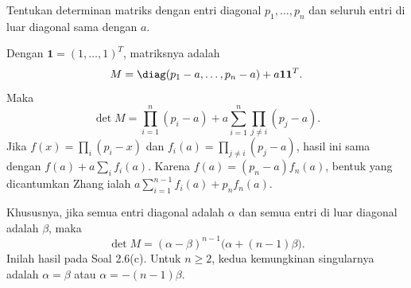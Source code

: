 \begin{exam}
      Tentukan determinan matriks dengan entri diagonal $p_1,\ldots,p_n$
      dan seluruh entri di luar diagonal sama dengan $a$.
\end{exam}
\begin{solution}
      Dengan $\boldsymbol{1}=(1,\ldots,1)^T$, matriksnya adalah
      \[
            M=\diag(p_1-a,\ldots,p_n-a)+a\boldsymbol{1}\boldsymbol{1}^T.
      \]
      Maka
      \[
            \det M=\prod_{i=1}^n(p_i-a)
            +a\sum_{i=1}^n\prod_{j\ne i}(p_j-a).
      \]
      Jika $f(x)=\prod_i(p_i-x)$ dan $f_i(a)=\prod_{j\ne i}(p_j-a)$,
      hasil ini sama dengan $f(a)+a\sum_i f_i(a)$.
      Karena $f(a)=(p_n-a)f_n(a)$, bentuk yang dicantumkan Zhang ialah
      $a\sum_{i=1}^{n-1}f_i(a)+p_nf_n(a)$.

      Khususnya, jika semua entri diagonal adalah $\alpha$ dan semua entri
      di luar diagonal adalah $\beta$, maka
      \[
            \boxed{\det M=(\alpha-\beta)^{n-1}
                  \bigl(\alpha+(n-1)\beta\bigr).}
      \]
      Inilah hasil pada Soal 2.6(c). Untuk $n\ge2$, kedua kemungkinan
      singularnya adalah $\alpha=\beta$ atau $\alpha=-(n-1)\beta$.
\end{solution}

